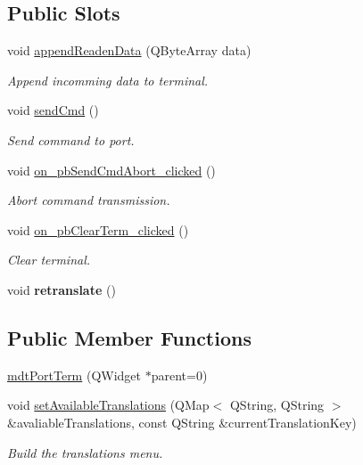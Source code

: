 \subsection*{Public Slots}
\begin{DoxyCompactItemize}
\item 
void \hyperlink{classmdt_port_term_a2372dc6e8f2926f2201b659ddbe3ec8e}{appendReadenData} (QByteArray data)
\begin{DoxyCompactList}\small\item\em Append incomming data to terminal. \end{DoxyCompactList}\item 
void \hyperlink{classmdt_port_term_a7ec568c44f862fe7aee83f1a271ac6bb}{sendCmd} ()
\begin{DoxyCompactList}\small\item\em Send command to port. \end{DoxyCompactList}\item 
void \hyperlink{classmdt_port_term_a1b232e686b401d7103eb1c682be330a9}{on\_\-pbSendCmdAbort\_\-clicked} ()
\begin{DoxyCompactList}\small\item\em Abort command transmission. \end{DoxyCompactList}\item 
\hypertarget{classmdt_port_term_abb3fc55837782dbea240b069a48b18ce}{
void \hyperlink{classmdt_port_term_abb3fc55837782dbea240b069a48b18ce}{on\_\-pbClearTerm\_\-clicked} ()}
\label{classmdt_port_term_abb3fc55837782dbea240b069a48b18ce}

\begin{DoxyCompactList}\small\item\em Clear terminal. \end{DoxyCompactList}\item 
\hypertarget{classmdt_port_term_a542e20f789bcdc5f2ddf2b6e698ceea2}{
void {\bfseries retranslate} ()}
\label{classmdt_port_term_a542e20f789bcdc5f2ddf2b6e698ceea2}

\end{DoxyCompactItemize}
\subsection*{Public Member Functions}
\begin{DoxyCompactItemize}
\item 
\hyperlink{classmdt_port_term_a5e93890f53b5112be80983779a3ab233}{mdtPortTerm} (QWidget $\ast$parent=0)
\item 
\hypertarget{classmdt_port_term_a9e2987c96c85189ce118aab7af77fb71}{
void \hyperlink{classmdt_port_term_a9e2987c96c85189ce118aab7af77fb71}{setAvailableTranslations} (QMap$<$ QString, QString $>$ \&avaliableTranslations, const QString \&currentTranslationKey)}
\label{classmdt_port_term_a9e2987c96c85189ce118aab7af77fb71}

\begin{DoxyCompactList}\small\item\em Build the translations menu. \end{DoxyCompactList}\end{DoxyCompactItemize}


